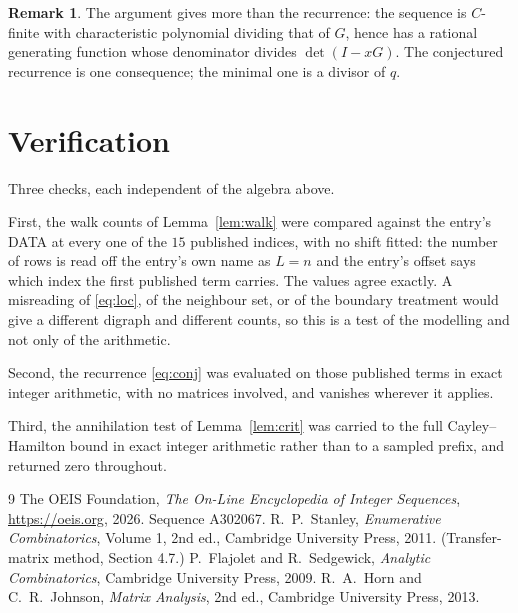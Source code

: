 \documentclass[11pt,a4paper]{article}
\theoremstyle{plain}
\theoremstyle{definition}
\newtheorem{remark}[theorem]{Remark}
\begin{document}
\begin{remark}
The argument gives more than the recurrence: the sequence is $C$-finite with characteristic
polynomial dividing that of $G$, hence has a rational generating function whose denominator
divides $\det(I-xG)$. The conjectured recurrence is one consequence; the minimal one is a
divisor of $q$.
\end{remark}

\section{Verification}

Three checks, each independent of the algebra above.

First, the walk counts of Lemma~\ref{lem:walk} were compared against the entry's DATA at
every one of the $15$ published indices, with no shift fitted: the number of rows is
read off the entry's own name as $L=n$ and the entry's offset says which index the first
published term carries. The values agree exactly. A misreading of \eqref{eq:loc}, of the
neighbour set, or of the boundary treatment would give a different digraph and different
counts, so this is a test of the modelling and not only of the arithmetic.

Second, the recurrence \eqref{eq:conj} was evaluated on those published terms in exact
integer arithmetic, with no matrices involved, and vanishes wherever it applies.

Third, the annihilation test of Lemma~\ref{lem:crit} was carried to the full
Cayley--Hamilton bound in exact integer arithmetic rather than to a sampled prefix, and
returned zero throughout.

\begin{thebibliography}{9}
 The OEIS Foundation, \emph{The On-Line Encyclopedia of Integer
Sequences}, \url{https://oeis.org}, 2026. Sequence A302067.
 R.~P.~Stanley, \emph{Enumerative Combinatorics}, Volume 1, 2nd ed.,
Cambridge University Press, 2011. (Transfer-matrix method, Section 4.7.)
 P.~Flajolet and R.~Sedgewick, \emph{Analytic Combinatorics}, Cambridge
University Press, 2009.
 R.~A.~Horn and C.~R.~Johnson, \emph{Matrix Analysis}, 2nd ed., Cambridge
University Press, 2013.
\end{thebibliography}
\end{document}
